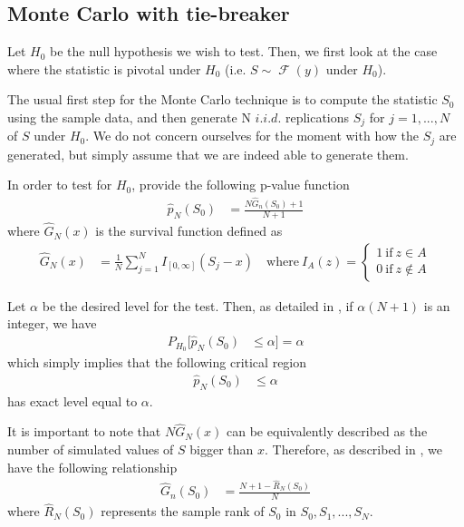 \documentclass[]{article}\usepackage[]{graphicx}\usepackage[]{color}
\DeclareMathOperator{\dist}{\mathcal{F}}
\begin{document}
\subsection{Monte Carlo with tie-breaker}

Let $H_0$ be the null hypothesis we wish to test. Then, we first look at the case where the statistic is pivotal under $H_0$ (i.e. $S \sim \dist(y)$ under $H_0$).

The usual first step for the Monte Carlo technique is to compute the statistic $S_0$ using the sample data, and then generate $\mathrm{N}$ $i.i.d$. replications $S_{j}$ for $j=1,..., N$ of $S$ under $H_0$. We do not concern ourselves for the moment with how the $S_j$ are generated, but simply assume that we are indeed able to generate them.

In order to test for $H_0$, \cite{dufour_monte_2003} provide the following p-value function
\begin{align}
\hat{p}_{N}(S_{0}) & =\frac{N\hat{G}_{n}(S_{0})+1}{N+1}
\end{align}
where $\hat{G}_{N}(x)$ is the survival function defined as
\begin{align}
	\label{eq:G_N}
	\hat{G}_{N}(x) & =\frac{1}{N}\sum_{j=1}^{N}I_{[0,\infty]}(S_{j}-x) \quad \mathrm{where} \ I_{A}(z)=\left\{\begin{array}{l}
		1\ \mathrm{if}\ z\in A\\
		0\ \mathrm{if}\ z\not\in A
	\end{array}\right.
\end{align}

Let $\alpha$ be the desired level for the test. Then, as detailed in \cite{dufour_monte_2003}, if $\alpha(N+1)$ is an integer, we have
\begin{align}
P_{H_{0}}[\hat{p}_{N}(S_{0}) & \leq\alpha]=\alpha
\end{align}
which simply implies that the following critical region
\begin{align}
	\label{eq:crit}
	\hat{p}_{N}(S_{0}) & \leq\alpha
\end{align}
has exact level equal to $\alpha$.

It is important to note that $N\hat{G}_{N}(x)$ can be equivalently described as the number of simulated values of $S$ bigger than $x$. Therefore, as described in \cite{dufour_monte_2003}, we have the following relationship
\begin{align}
\hat{G}_{n}(S_{0}) &= \frac{N+1-\hat{R}_N(S_0)}{N}
\end{align}
where $\hat{R}_N(S_0)$ represents the sample rank of $S_0$ in $S_0,S_{1},...,S_{N}$.
\end{document}
